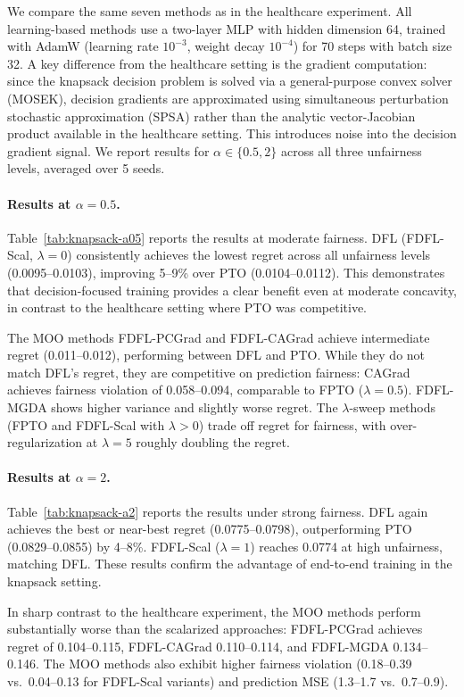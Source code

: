 \documentclass[ijoc,sglanonrev]{informs4}
\begin{document}
We compare the same seven methods as in the healthcare experiment. All learning-based methods use a two-layer MLP with hidden dimension 64, trained with AdamW (learning rate $10^{-3}$, weight decay $10^{-4}$) for 70 steps with batch size 32. A key difference from the healthcare setting is the gradient computation: since the knapsack decision problem is solved via a general-purpose convex solver (MOSEK), decision gradients are approximated using simultaneous perturbation stochastic approximation (SPSA) rather than the analytic vector-Jacobian product available in the healthcare setting. This introduces noise into the decision gradient signal. We report results for $\alpha \in \{0.5, 2\}$ across all three unfairness levels, averaged over 5 seeds.


\paragraph{Results at $\alpha = 0.5$.}
Table~\ref{tab:knapsack-a05} reports the results at moderate fairness. DFL (FDFL-Scal, $\lambda = 0$) consistently achieves the lowest regret across all unfairness levels (0.0095--0.0103), improving 5--9\% over PTO (0.0104--0.0112). This demonstrates that decision-focused training provides a clear benefit even at moderate concavity, in contrast to the healthcare setting where PTO was competitive.

The MOO methods FDFL-PCGrad and FDFL-CAGrad achieve intermediate regret (0.011--0.012), performing between DFL and PTO. While they do not match DFL's regret, they are competitive on prediction fairness: CAGrad achieves fairness violation of 0.058--0.094, comparable to FPTO ($\lambda = 0.5$). FDFL-MGDA shows higher variance and slightly worse regret. The $\lambda$-sweep methods (FPTO and FDFL-Scal with $\lambda > 0$) trade off regret for fairness, with over-regularization at $\lambda = 5$ roughly doubling the regret.

\paragraph{Results at $\alpha = 2$.}
Table~\ref{tab:knapsack-a2} reports the results under strong fairness. DFL again achieves the best or near-best regret (0.0775--0.0798), outperforming PTO (0.0829--0.0855) by 4--8\%. FDFL-Scal ($\lambda = 1$) reaches 0.0774 at high unfairness, matching DFL. These results confirm the advantage of end-to-end training in the knapsack setting.

In sharp contrast to the healthcare experiment, the MOO methods perform substantially worse than the scalarized approaches: FDFL-PCGrad achieves regret of 0.104--0.115, FDFL-CAGrad 0.110--0.114, and FDFL-MGDA 0.134--0.146. The MOO methods also exhibit higher fairness violation (0.18--0.39 vs.\ 0.04--0.13 for FDFL-Scal variants) and prediction MSE (1.3--1.7 vs.\ 0.7--0.9). 
\end{document}
